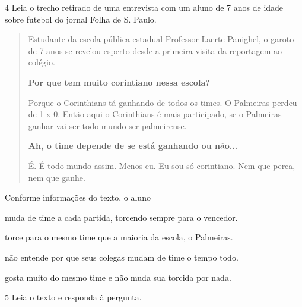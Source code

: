 \num{4} Leia o trecho retirado de uma entrevista com um aluno de 7 anos
de idade sobre futebol do jornal Folha de S. Paulo.

\begin{quote}
Estudante da escola pública estadual Professor Laerte Panighel, o garoto
de 7 anos se revelou esperto desde a primeira visita da reportagem ao
colégio.

\textbf{Por que tem muito corintiano nessa escola?}

Porque o Corinthians tá ganhando de todos os times. O Palmeiras perdeu
de 1 x 0. Então aqui o Corinthians é mais participado, se o
Palmeiras ganhar vai ser todo mundo ser palmeirense.

\textbf{Ah, o time depende de se está ganhando ou não...}

É. É todo mundo assim. Menos eu. Eu sou só corintiano. Nem que perca,
nem que ganhe.

\end{quote}

Conforme informações do texto, o aluno

\begin{escolha}
\item muda de time a cada partida, torcendo sempre para o vencedor.

\item torce para o mesmo time que a maioria da escola, o Palmeiras.

\item não entende por que seus colegas mudam de time o tempo todo.

\item gosta muito do mesmo time e não muda sua torcida por nada.
\end{escolha}



\num{5} Leia o texto e responda à pergunta.

